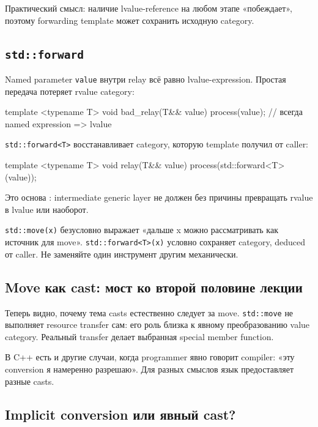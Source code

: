 Практический смысл: наличие lvalue-reference на любом этапе «побеждает»,
поэтому forwarding template может сохранить исходную category.

\subsection{\texttt{std::forward}}

Named parameter \texttt{value} внутри relay всё равно
lvalue-expression. Простая передача потеряет rvalue category:

\begin{cppcode}
template <typename T>
void bad_relay(T&& value) {
    process(value); // всегда named expression => lvalue
}
\end{cppcode}

\texttt{std::forward<T>} восстанавливает category, которую template получил от
caller:

\begin{cppcode}
template <typename T>
void relay(T&& value) {
    process(std::forward<T>(value));
}
\end{cppcode}

Это основа : intermediate generic layer не должен
без причины превращать rvalue в lvalue или наоборот.

\begin{warningbox}
\texttt{std::move(x)} безусловно выражает «дальше x можно рассматривать как
источник для move». \texttt{std::forward<T>(x)} условно сохраняет category,
deduced от caller. Не заменяйте один инструмент другим механически.
\end{warningbox}

\subsection{Move как cast: мост ко второй половине лекции}

Теперь видно, почему тема casts естественно следует за move.
\texttt{std::move} не выполняет resource transfer сам: его роль близка к
явному преобразованию value category. Реальный transfer делает выбранная
special member function.

В C++ есть и другие случаи, когда programmer явно говорит compiler:
«эту conversion я намеренно разрешаю». Для разных смыслов язык предоставляет
разные casts.

\subsection{Implicit conversion или явный cast?}

